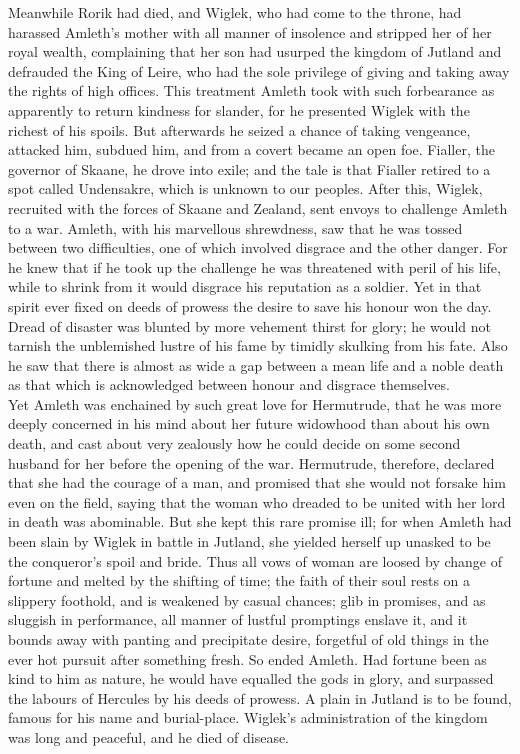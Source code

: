 \documentclass[10pt,a4paper]{report}
\begin{document}
Meanwhile Rorik had died, and Wiglek, who had come to the throne, had harassed Amleth's mother with all manner of insolence and stripped her of her royal wealth, complaining that her son had usurped the kingdom of Jutland and defrauded the King of Leire, who had the sole privilege of giving and taking away the rights of high offices. This treatment Amleth took with such forbearance as apparently to return kindness for slander, for he presented Wiglek with the richest of his spoils. But afterwards he seized a chance of taking vengeance, attacked him, subdued him, and from a covert became an open foe. Fialler, the governor of Skaane, he drove into exile; and the tale is that Fialler retired to a spot called Undensakre, which is unknown to our peoples. After this, Wiglek, recruited with the forces of Skaane and Zealand, sent envoys to challenge Amleth to a war. Amleth, with his marvellous shrewdness, saw that he was tossed between two difficulties, one of which involved disgrace and the other danger. For he knew that if he took up the challenge he was threatened with peril of his life, while to shrink from it would disgrace his reputation as a soldier. Yet in that spirit ever fixed on deeds of prowess the desire to save his honour won the day. Dread of disaster was blunted by more vehement thirst for glory; he would not tarnish the unblemished lustre of his fame by timidly skulking from his fate. Also he saw that there is almost as wide a gap between a mean life and a noble death as that which is acknowledged between honour and disgrace themselves.\\

Yet Amleth was enchained by such great love for Hermutrude, that he was more deeply concerned in his mind about her future widowhood than about his own death, and cast about very zealously how he could decide on some second husband for her before the opening of the war. Hermutrude, therefore, declared that she had the courage of a man, and promised that she would not forsake him even on the field, saying that the woman who dreaded to be united with her lord in death was abominable. But she kept this rare promise ill; for when Amleth had been slain by Wiglek in battle in Jutland, she yielded herself up unasked to be the conqueror's spoil and bride. Thus all vows of woman are loosed by change of fortune and melted by the shifting of time; the faith of their soul rests on a slippery foothold, and is weakened by casual chances; glib in promises, and as sluggish in performance, all manner of lustful promptings enslave it, and it bounds away with panting and precipitate desire, forgetful of old things in the ever hot pursuit after something fresh. So ended Amleth. Had fortune been as kind to him as nature, he would have equalled the gods in glory, and surpassed the labours of Hercules by his deeds of prowess. A plain in Jutland is to be found, famous for his name and burial-place. Wiglek's administration of the kingdom was long and peaceful, and he died of disease.\\
\end{document}
